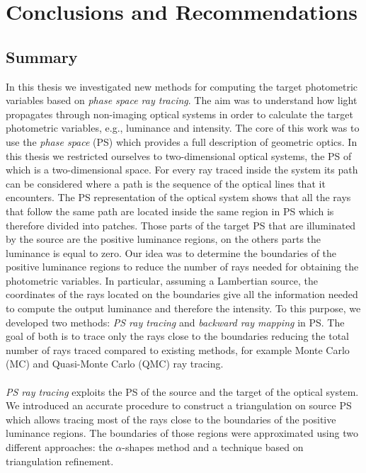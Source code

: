 \chapter{Conclusions and Recommendations}\label{chap:conclusions}
\section{Summary}
In this thesis we investigated new methods for computing the target photometric variables based on \textit{phase space ray tracing}. The aim was to understand how light propagates through non-imaging optical systems in order to calculate the target photometric variables, e.g., luminance and intensity. 
The core of this work was to use the \textit{phase space} (PS) which provides a full description of geometric optics. In this thesis we restricted ourselves to two-dimensional optical systems, the PS of which is a two-dimensional space. For every ray traced inside the system its path can be considered where a path is the sequence of the optical lines that it encounters. The PS representation of the optical system shows that all the rays that follow the same path are located inside the same region in PS which is therefore divided into patches. 
Those parts of the target PS that are illuminated by the source are the positive luminance regions, on the others parts the luminance is equal to zero. Our idea was to determine the boundaries of the positive luminance regions to reduce the number of rays needed for obtaining the photometric variables. In particular, assuming a Lambertian source, the coordinates of the rays located on the boundaries give all the information needed to compute the output luminance and therefore the intensity.
To this purpose, we developed two methods: \emph{PS ray tracing} and \emph{backward ray mapping} in PS. The goal of both is to trace only the rays close to the boundaries reducing the total number of rays traced compared to existing methods, for example Monte Carlo (MC) and Quasi-Monte Carlo (QMC) ray tracing.
\\ \\ \indent \emph{PS ray tracing} exploits the PS of the source and the target of the optical system. %
We introduced an accurate procedure to construct a triangulation on source PS which allows tracing most of the rays close to the boundaries of the positive luminance regions. 
The boundaries of those regions were approximated using two different approaches: the $\alpha$-shapes method and a technique based on triangulation refinement. \\ \indent 
